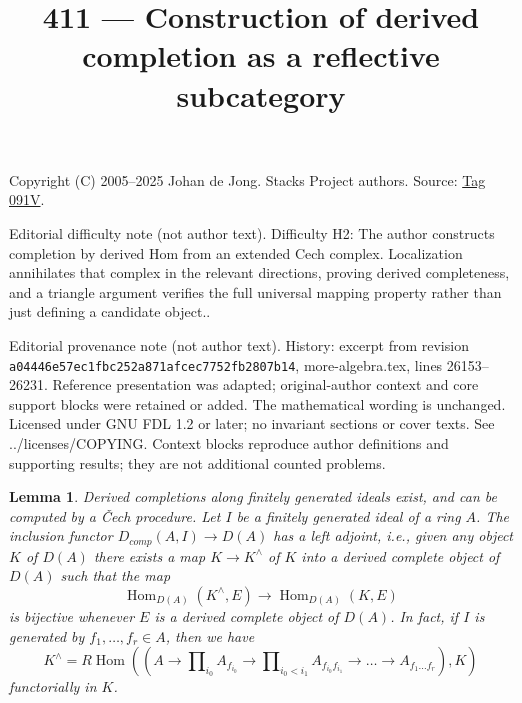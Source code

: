 \documentclass{amsart}
\newenvironment{slogan}{\comment}{\endcomment}
\theoremstyle{plain}
\newtheorem{lemma}[subsection]{Lemma}
\theoremstyle{definition}
\theoremstyle{remark}
\numberwithin{equation}{subsection}
\def\Hom{\mathop{\mathrm{Hom}}\nolimits}
\begin{document}
\title[Stacks Project, Tag 091V]{411 --- Construction of derived completion as a reflective subcategory}
\maketitle
\noindent Copyright (C) 2005--2025 Johan de Jong. Stacks Project authors. Source: \href{https://stacks.math.columbia.edu/tag/091V}{Tag 091V}.

\noindent Editorial difficulty note (not author text). Difficulty H2: The author constructs completion by derived Hom from an extended Cech complex. Localization annihilates that complex in the relevant directions, proving derived completeness, and a triangle argument verifies the full universal mapping property rather than just defining a candidate object..

\noindent Editorial provenance note (not author text). History: excerpt from revision \texttt{a0444\allowbreak 6e57e\allowbreak c1fbc\allowbreak 252a8\allowbreak 71afc\allowbreak ec775\allowbreak 2fb28\allowbreak 07b14}, more-algebra.tex, lines 26153--26231. Reference presentation was adapted; original-author context and core support blocks were retained or added. The mathematical wording is unchanged. Licensed under GNU FDL 1.2 or later; no invariant sections or cover texts. See ../licenses/COPYING. Context blocks reproduce author definitions and supporting results; they are not additional counted problems.

\begin{lemma}
\label{lemma-derived-completion}
\begin{slogan}
Derived completions along finitely generated ideals exist, and can
be computed by a {\v C}ech procedure.
\end{slogan}
Let $I$ be a finitely generated ideal of a ring $A$.
The inclusion functor $D_{comp}(A, I) \to D(A)$ has a
left adjoint, i.e., given any object $K$ of $D(A)$ there
exists a map $K \to K^\wedge$ of $K$ into a derived complete
object of $D(A)$ such that the map
$$
\Hom_{D(A)}(K^\wedge, E) \longrightarrow \Hom_{D(A)}(K, E)
$$
is bijective whenever $E$ is a derived complete object of $D(A)$.
In fact, if $I$ is generated by $f_1, \ldots, f_r \in A$, then we have
$$
K^\wedge = R\Hom\left((A \to \prod\nolimits_{i_0} A_{f_{i_0}} \to
\prod\nolimits_{i_0 < i_1} A_{f_{i_0}f_{i_1}}
\to \ldots \to A_{f_1\ldots f_r}), K\right)
$$
functorially in $K$.
\end{lemma}
\end{document}

